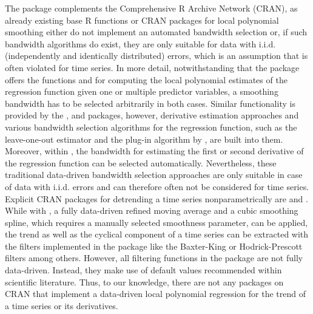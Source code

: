 The  package complements the Comprehensive R Archive Network (CRAN), as already existing base R functions or CRAN packages for local polynomial smoothing either do not implement an automated bandwidth selection or, if such bandwidth algorithms do exist, they are only suitable for data with i.i.d. (independently and identically distributed) errors, which is an assumption that is often violated for time series. In more detail, notwithstanding that the  package offers the functions  and  for computing the local polynomial estimates of the regression function given one or multiple predictor variables, a smoothing bandwidth has to be selected arbitrarily in both cases. Similar functionality is provided by the  \citep{ojeda2018locpol},  \citep{wand2021KernSmooth} and  \citep{herrmann2021lokern} packages, however, derivative estimation approaches and various bandwidth selection algorithms for the regression function, such as the leave-one-out estimator \citep{allen1974relationship} and the plug-in algorithm by \citet{ruppert1995effective}, are built into them. Moreover, within , the bandwidth for estimating the first or second derivative of the regression function can be selected automatically. Nevertheless, these traditional data-driven bandwidth selection approaches are only suitable in case of data with i.i.d. errors \citep{hart1991kernel,altman1990kernel,opsomer1997nonparametric} and can therefore often not be considered for time series. Explicit CRAN packages for detrending a time series nonparametrically are  \citep{qiu2015rmaf} and  \citep{balcilar2019mFilter}. While with , a fully data-driven refined moving average and a cubic smoothing spline, which requires a manually selected smoothness parameter, can be applied, the trend as well as the cyclical component of a time series can be extracted with the filters implemented in the  package like the Baxter-King \citep{baxter1999measuring} or Hodrick-Prescott \citep{hodrick1997postwar} filters among others. However, all filtering functions in the  package are not fully data-driven. Instead, they make use of default values recommended within scientific literature. Thus, to our knowledge, there are not any packages on CRAN that implement a data-driven local polynomial regression for the trend of a time series or its derivatives.

